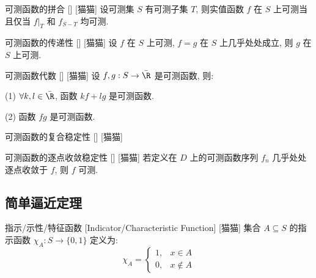 \documentclass[UTF8]{ctexart}
\begin{document}
            \begin{ppt}
                {可测函数的拼合}
                []
                [猫猫]
                设可测集 \(S\) 有可测子集 \(T\), 则实值函数 \(f\) 在 \(S\) 上可测当且仅当 \(f|_T\) 和 \(f_{S-T}\) 均可测.
            \end{ppt}
            
            \begin{ppt}
                {可测函数的传递性}
                []
                [猫猫]
                设 \(f\) 在 \(S\) 上可测, \(f=g\) 在 \(S\) 上几乎处处成立, 则 \(g\) 在 \(S\) 上可测. 
            \end{ppt}
            
            \begin{ppt}
                {可测函数代数}
                []
                [猫猫]
                设 \(f,g:S\to\bar{\R}\) 是可测函数, 则: 
                
                (1) \(\forall k,l\in\bar{\R}\), 函数 \(k f+l g\) 是可测函数. 

                (2) 函数 \(fg\) 是可测函数. 
            \end{ppt}
            
            \begin{ppt}
                {可测函数的复合稳定性}
                []
                [猫猫]
            \end{ppt}
            
            \begin{ppt}
                {可测函数的逐点收敛稳定性}
                []
                [猫猫]
                若定义在 \(D\) 上的可测函数序列 \(f_n\) 几乎处处逐点收敛于 \(f\), 则 \(f\) 可测. 
            \end{ppt}

        \subsection{简单逼近定理} %
            
            \begin{dfn}
                {指示/示性/特征函数}
                [Indicator/Characteristic Function]
                [猫猫]
                集合 \(A\subseteq S\) 的指示函数 \(\chi_A:S\to\{0,1\}\) 定义为:
                \[\chi_A=
                \begin{cases}
                    1, & x\in A\\
                    0, & x\notin A
                \end{cases}\]
            \end{dfn}
            
\end{document}
